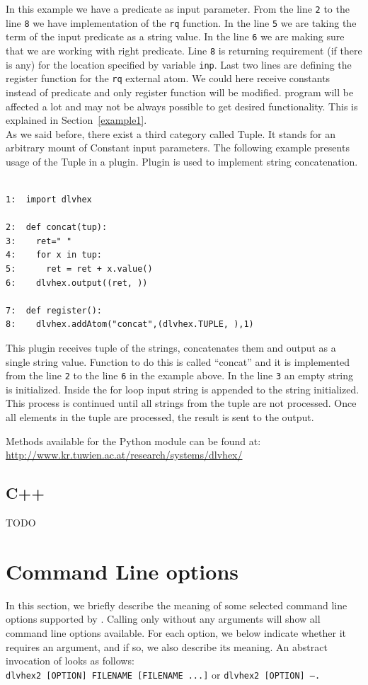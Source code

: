 \documentclass[14pt,a4paper, titlepage]{article}
\begin{document}
In this example we 
have a predicate as input parameter. From the line \verb+2+ to 
the line \verb+8+ we have implementation of the \verb+rq+ function. In 
the line \verb+5+ we are taking the term of the input predicate as 
a string value. In the line \verb+6+ we are making sure that we are  
working with right predicate. Line \verb+8+ is returning  
requirement (if there is any) for the location specified by variable 
\verb+inp+. Last two lines are defining the register 
function for the \verb+rq+ external atom. We could here receive constants instead of predicate and only register function will be modified. \hex{} program will be affected a lot and may not be always possible to get desired functionality. This is explained in Section~\ref{example1}.  
\bigskip \\
As we said before, there exist a third category called Tuple. It stands for an arbitrary mount of Constant input parameters. The following example presents usage of the Tuple in a plugin. Plugin is used to implement string concatenation.  
\begin{exmp}
\label{tupleAsInput}
\begin{verbatim}

1:  import dlvhex

2:  def concat(tup):
3:    ret=" "
4:    for x in tup:
5:      ret = ret + x.value()
6:    dlvhex.output((ret, ))

7:  def register():
8:    dlvhex.addAtom("concat",(dlvhex.TUPLE, ),1)
\end{verbatim}
\end{exmp}
This plugin receives tuple of the strings, concatenates 
them and output as a single string value. Function to do 
this is called ``concat'' and it is implemented from the 
line \verb+2+ to the line \verb+6+ in the example above. In the line \verb+3+ an 
empty string is initialized. Inside the for loop input 
string is appended to the string initialized. This process 
is continued until all strings from the tuple are not 
processed. Once all elements in the tuple are processed, 
the result is sent to the output.  
 
Methods available for the \dlvhex{} Python module can be found at:\\ \url{http://www.kr.tuwien.ac.at/research/systems/dlvhex/}
\subsection{C++}
TODO

\section{Command Line options}
\label{sec:commandline}
In this section, we briefly describe the meaning of some 
selected command line options supported by \dlvhex{}. 
Calling only \dlvhex{} without any arguments will show all 
command line options available. For each option, we below indicate whether it requires an argument, and if so, we also describe its meaning. An abstract invocation of \dlvhex{} looks as follows:\\
\texttt{dlvhex2 [OPTION] FILENAME [FILENAME ...]} or \texttt{dlvhex2 [OPTION] --.}
\end{document}

